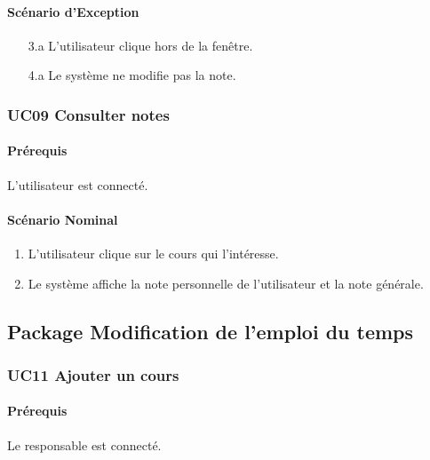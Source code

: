 \documentclass[a4paper,12pt]{article}
\begin{document}
\paragraph{Scénario d'Exception}
\begin{enumerate}
    \item[3.a] L'utilisateur clique hors de la fenêtre.
    \item[4.a] Le système ne modifie pas la note.
\end{enumerate}

\subsubsection{UC09 Consulter notes}
\paragraph{Prérequis} L'utilisateur est connecté.

\paragraph{Scénario Nominal}
\begin{enumerate}
    \item L'utilisateur clique sur le cours qui l'intéresse.
    \item Le système affiche la note personnelle de l'utilisateur et la note générale.
\end{enumerate}

\subsection{Package Modification de l'emploi du temps}

\subsubsection{UC11 Ajouter un cours}
\paragraph{Prérequis} Le responsable est connecté.
\end{document}
